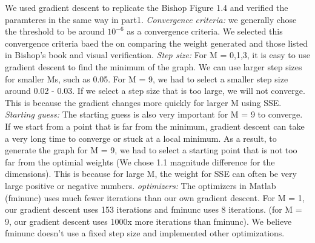 We used gradient descent to replicate 
the Bishop Figure 1.4 and verified the paramteres in the same way in part1. 
\textit{Convergence criteria:} we generally chose the threshold to be around $10^{-6}$ as a convergence criteria. We selected this convergence criteria baed the on comparing the weight generated and those listed in Bishop's book and visual verification. 
\textit{Step size:} For M = 0,1,3, it is easy to use gradient descent to find the minimum of the graph. We can use larger step sizes for smaller Ms, such as 0.05. For M = 9, we had to select a smaller step size around 0.02 - 0.03. If we select a step size that is too large, we will not converge. This is because the gradient changes more quickly for larger M using SSE.
\textit{Starting guess:} The starting guess is also very important for M = 9 to converge. If we start from a point that is far from the minimum, gradient descent can take a very long time to converge or stuck at a local minimum. As a result, to generate the graph for M = 9, we had to select a starting point that is not too far from the optimial weights (We chose 1.1 magnitude difference for the dimensions). This is because for large M, the weight for SSE can often be very large positive or negative numbers. 
\textit{optimizers:} The optimizers in Matlab (fminunc) uses much fewer iterations than our own gradient descent. For M = 1, our gradient descent uses 153 iterations and fminunc uses 8 iterations. (for M = 9, our gradient descent uses 1000x more iterations than fminunc). We believe fminunc doesn't use a fixed step size and implemented other optimizations. 

